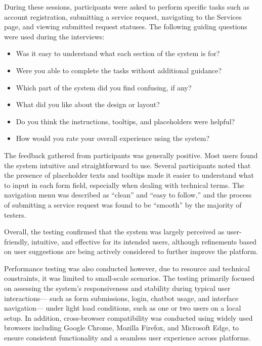 During these sessions, participants were asked to perform specific tasks such as account registration, submitting a service request, navigating to the Services page, and viewing submitted request statuses. The following guiding questions were used during the interviews:

\begin{itemize}
    \item Was it easy to understand what each section of the system is for?
    \item Were you able to complete the tasks without additional guidance?
    \item Which part of the system did you find confusing, if any?
    \item What did you like about the design or layout?
    \item Do you think the instructions, tooltips, and placeholders were helpful?
    \item How would you rate your overall experience using the system?
\end{itemize}

The feedback gathered from participants was generally positive. Most users found the system intuitive and straightforward to use. Several participants noted that the presence of placeholder texts and tooltips made it easier to understand what to input in each form field, especially when dealing with technical terms. The navigation menu was described as “clean” and “easy to follow,” and the process of submitting a service request was found to be “smooth” by the majority of testers.

Overall, the testing confirmed that the system was largely perceived as user-friendly, intuitive, and effective for its intended users, although refinements based on user suggestions are being actively considered to further improve the platform.

Performance testing was also conducted however, due to resource and technical constraints, it was limited to small-scale scenarios. The testing primarily focused on assessing the system’s responsiveness and stability during typical user interactions— such as form submissions, login, chatbot usage, and interface navigation— under light load conditions, such as one or two users on a local setup. In addition, cross-browser compatibility was conducted using widely used browsers including Google Chrome, Mozilla Firefox, and Microsoft Edge, to ensure consistent functionality and a seamless user experience across platforms.

